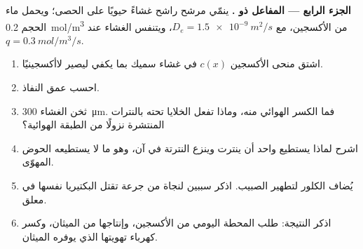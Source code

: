 \begin{problem}
\medskip
\noindent\textbf{الجزء الرابع --- المفاعل ذو .}
ينمّي مرشح راشح غشاءً حيويًا على الحصى؛ ويحمل ماء الحجم
\qty{0.2}{mol/m^3} من الأكسجين، مع $D_e = \qty{1.5e-9}{m^2/s}$،
ويتنفس الغشاء عند $q = \qty{0.3}{mol/m^3/s}$.
\begin{enumerate}[resume]
  \item اشتق منحى الأكسجين $c(x)$ في غشاء سميك بما يكفي ليصير
        لاأكسجينيًا.
  \item احسب عمق النفاذ.
  \item ثخن الغشاء \qty{300}{\micro m}. فما الكسر الهوائي منه، وماذا
        تفعل الخلايا تحته بالنترات المنتشرة نزولًا من الطبقة
        الهوائية؟
  \item اشرح لماذا يستطيع  واحد أن ينترت وينزع النترتة في
        آن، وهو ما لا يستطيعه الحوض المهوّى.
  \item يُضاف الكلور لتطهير الصبيب. اذكر سببين لنجاة 
        من جرعة تقتل البكتيريا نفسها في معلق.
  \item اذكر النتيجة: طلب المحطة اليومي من الأكسجين، وإنتاجها من
        الميثان، وكسر كهرباء تهويتها الذي يوفره الميثان.
\end{enumerate}
\end{problem}
